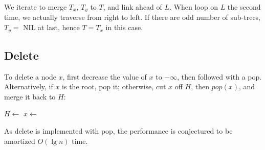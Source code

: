 \documentclass[b5paper]{article}
\begin{document}
We iterate to merge $T_x$, $T_y$ to $T$, and link ahead of $L$. When loop on $L$ the second time, we actually traverse from right to left. If there are odd number of sub-trees, $T_y = $ NIL at last, hence $T = T_x$ in this case.

\subsection{Delete}

To delete a node $x$, first decrease the value of $x$ to $-\infty$, then followed with a pop. Alternatively, if $x$ is the root, pop it; otherwise, cut $x$ off $H$, then $pop(x)$, and merge it back to $H$:

\begin{algorithmic}[1]
    \State {}
  \Else
    \State $H \gets$ 
    \State $x \gets$ 
    \State {}
  \EndIf
\EndFunction
\end{algorithmic}

As delete is implemented with pop, the performance is conjectured to be amortized $O(\lg n)$ time.

\begin{Exercise}\label{ex:pairing-heap-del}
\end{Exercise}
\end{document}
